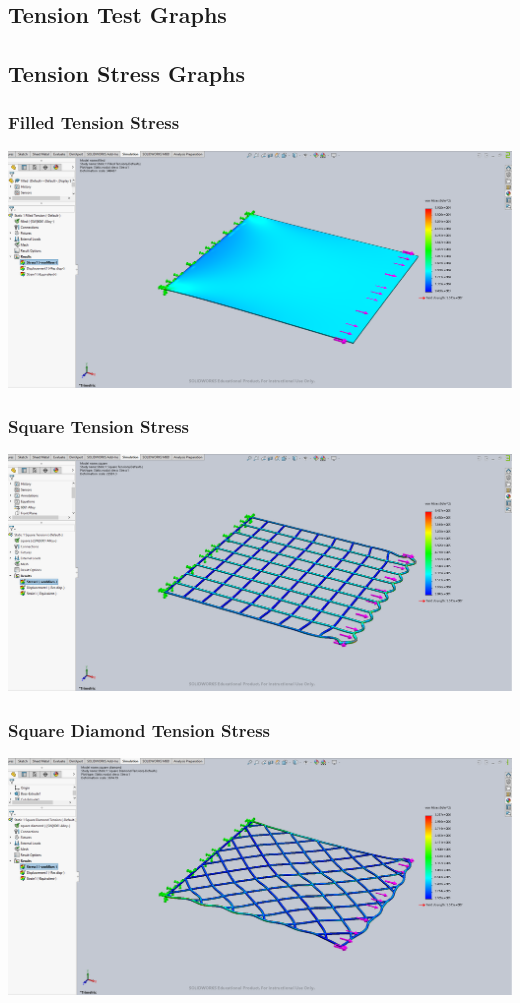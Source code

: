 \documentclass[12pt, letterpaper]{article}
\begin{document}
\newpage
\begin{singlespace}
\section{Tension Test Graphs}
\label{ap:te}



\subsection{Tension Stress Graphs}
\label{ap:te-vm}


\subsubsection{Filled Tension Stress}
\label{ap:f-te-vm}
\includegraphics[width=0.8\linewidth]{./graphs/tension/filled-tension-stress}

\subsubsection{Square Tension Stress}
\label{ap:s-te-vm}
\includegraphics[width=0.8\linewidth]{./graphs/tension/square-tension-stress}

\subsubsection{Square Diamond Tension Stress}
\label{ap:sd-te-vm}
\includegraphics[width=0.8\linewidth]{./graphs/tension/square-diamond-tension-stress}


\end{singlespace}
\end{document}
